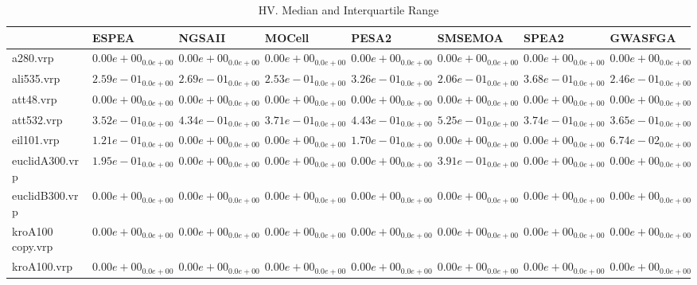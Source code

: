 \documentclass{article}
\begin{document}
\begin{table}
\caption{HV. Median and Interquartile Range}
\label{table: HV}
\centering
\begin{scriptsize}
\begin{tabular}{llllllll}
\hline & ESPEA & NGSAII & MOCell & PESA2 & SMSEMOA & SPEA2 &  GWASFGA\\
\hline 
a280.vrp & $  0.00e+00_{ 0.0e+00}$ & $  0.00e+00_{ 0.0e+00}$ & $  0.00e+00_{ 0.0e+00}$ & $  0.00e+00_{ 0.0e+00}$ & $  0.00e+00_{ 0.0e+00}$ & $  0.00e+00_{ 0.0e+00}$ & $  0.00e+00_{ 0.0e+00}$ \\
ali535.vrp & $  2.59e-01_{ 0.0e+00}$ & $  2.69e-01_{ 0.0e+00}$ & $  2.53e-01_{ 0.0e+00}$ & \cellcolor{gray25}$  3.26e-01_{ 0.0e+00}$ & $  2.06e-01_{ 0.0e+00}$ & \cellcolor{gray95}$  3.68e-01_{ 0.0e+00}$ & $  2.46e-01_{ 0.0e+00}$ \\
att48.vrp & $  0.00e+00_{ 0.0e+00}$ & $  0.00e+00_{ 0.0e+00}$ & $  0.00e+00_{ 0.0e+00}$ & $  0.00e+00_{ 0.0e+00}$ & $  0.00e+00_{ 0.0e+00}$ & $  0.00e+00_{ 0.0e+00}$ & $  0.00e+00_{ 0.0e+00}$ \\
att532.vrp & $  3.52e-01_{ 0.0e+00}$ & $  4.34e-01_{ 0.0e+00}$ & $  3.71e-01_{ 0.0e+00}$ & \cellcolor{gray25}$  4.43e-01_{ 0.0e+00}$ & \cellcolor{gray95}$  5.25e-01_{ 0.0e+00}$ & $  3.74e-01_{ 0.0e+00}$ & $  3.65e-01_{ 0.0e+00}$ \\
eil101.vrp & \cellcolor{gray25}$  1.21e-01_{ 0.0e+00}$ & $  0.00e+00_{ 0.0e+00}$ & $  0.00e+00_{ 0.0e+00}$ & \cellcolor{gray95}$  1.70e-01_{ 0.0e+00}$ & $  0.00e+00_{ 0.0e+00}$ & $  0.00e+00_{ 0.0e+00}$ & $  6.74e-02_{ 0.0e+00}$ \\
euclidA300.vrp & \cellcolor{gray25}$  1.95e-01_{ 0.0e+00}$ & $  0.00e+00_{ 0.0e+00}$ & $  0.00e+00_{ 0.0e+00}$ & $  0.00e+00_{ 0.0e+00}$ & \cellcolor{gray95}$  3.91e-01_{ 0.0e+00}$ & $  0.00e+00_{ 0.0e+00}$ & $  0.00e+00_{ 0.0e+00}$ \\
euclidB300.vrp & $  0.00e+00_{ 0.0e+00}$ & $  0.00e+00_{ 0.0e+00}$ & $  0.00e+00_{ 0.0e+00}$ & $  0.00e+00_{ 0.0e+00}$ & $  0.00e+00_{ 0.0e+00}$ & $  0.00e+00_{ 0.0e+00}$ & $  0.00e+00_{ 0.0e+00}$ \\
kroA100 copy.vrp & $  0.00e+00_{ 0.0e+00}$ & $  0.00e+00_{ 0.0e+00}$ & $  0.00e+00_{ 0.0e+00}$ & $  0.00e+00_{ 0.0e+00}$ & $  0.00e+00_{ 0.0e+00}$ & $  0.00e+00_{ 0.0e+00}$ & $  0.00e+00_{ 0.0e+00}$ \\
kroA100.vrp & $  0.00e+00_{ 0.0e+00}$ & $  0.00e+00_{ 0.0e+00}$ & $  0.00e+00_{ 0.0e+00}$ & $  0.00e+00_{ 0.0e+00}$ & $  0.00e+00_{ 0.0e+00}$ & $  0.00e+00_{ 0.0e+00}$ & $  0.00e+00_{ 0.0e+00}$ \\

\end{tabular}
\end{scriptsize}
\end{table}
\end{document}
